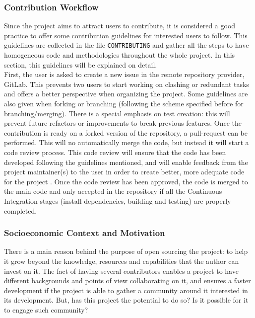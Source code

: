 \subsubsection{Contribution Workflow}

Since the project aims to attract users to contribute, it is considered a good
practice to offer some contribution guidelines for interested users to follow.
This guidelines are collected in the file \texttt{CONTRIBUTING} and gather all
the steps to have homogeneous code and methodologies throughout the whole
project. In this section, this guidelines will be explained on detail.\\

First, the user is asked to create a new issue in the remote repository
provider, GitLab. This prevents two users to start working on clashing or
redundant tasks and offers a better perspective when organizing the project.
Some guidelines are also given when forking or branching (following the scheme
specified before for branching/merging). There is a special emphasis on test
creation: this will prevent future refactors or improvements to break previous
features. Once the contribution is ready on a forked version of the repository,
a pull-request can be performed. This will no automatically merge the code, but
instead it will start a code review process. This code review will ensure that
the code has been developed following the guidelines mentioned, and will enable
feedback from the project maintainer(s) to the user in order to create better,
more adequate code for the project \cite{beller-2014-review}. Once the code
review has been approved, the code is merged to the main code and only accepted
in the repository if all the Continuous Integration stages (install
dependencies, building and testing) are properly completed.\\

\subsubsection{Socioeconomic Context and Motivation}

There is a main reason behind the purpose of open sourcing the project: to help
it grow beyond the knowledge, resources and capabilities that the author can
invest on it. The fact of having several contributors enables a project to have
different backgrounds and points of view collaborating on it, and ensures a
faster development if the project is able to gather a community around it
interested in its development. But, has this project the potential to do so? Is
it possible for it to engage such community?\\

